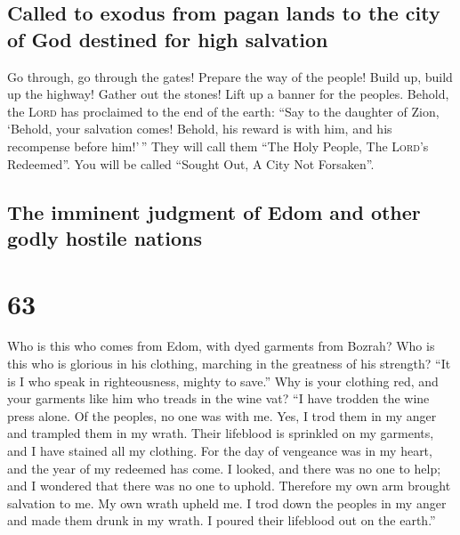\hypertarget{called-to-exodus-from-pagan-lands-to-the-city-of-god-destined-for-high-salvation}{%
\subsection{Called to exodus from pagan lands to the city of God
destined for high
salvation}\label{called-to-exodus-from-pagan-lands-to-the-city-of-god-destined-for-high-salvation}}

 Go through, go through the gates! Prepare the way of the
people! Build up, build up the highway! Gather out the stones! Lift up a
banner for the peoples.  Behold, the \textsc{Lord} has
proclaimed to the end of the earth: ``Say to the daughter of Zion,
`Behold, your salvation comes! Behold, his reward is with him, and his
recompense before him!'\,''  They will call them ``The
Holy People, The \textsc{Lord}'s Redeemed''. You will be called ``Sought
Out, A City Not Forsaken''.

\hypertarget{the-imminent-judgment-of-edom-and-other-godly-hostile-nations}{%
\subsection{The imminent judgment of Edom and other godly hostile
nations}\label{the-imminent-judgment-of-edom-and-other-godly-hostile-nations}}

\hypertarget{section-62}{%
\section{63}\label{section-62}}

 Who is this who comes from Edom, with dyed garments from
Bozrah? Who is this who is glorious in his clothing, marching in the
greatness of his strength? ``It is I who speak in righteousness, mighty
to save.''  Why is your clothing red, and your garments
like him who treads in the wine vat?  ``I have trodden the
wine press alone. Of the peoples, no one was with me. Yes, I trod them
in my anger and trampled them in my wrath. Their lifeblood is sprinkled
on my garments, and I have stained all my clothing.  For
the day of vengeance was in my heart, and the year of my redeemed has
come.  I looked, and there was no one to help; and I
wondered that there was no one to uphold. Therefore my own arm brought
salvation to me. My own wrath upheld me.  I trod down the
peoples in my anger and made them drunk in my wrath. I poured their
lifeblood out on the earth.''

